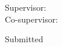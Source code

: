 \begin{titlepage}
    Supervisor: \supervisor\\[1.0cm] %
    \ifdefined\cosupervisor
    Co-supervisor: \cosupervisor\\[2cm] %
    \fi
    
    
    
    {\large Submitted \\ }\\[2cm] %
    
     
    \vfill
    
    \vfill %
    
    \large \school\\[1.5ex] %
    \ifdefined\department
    \large \department\\[1.5cm] %
    \fi
    
    \end{titlepage}